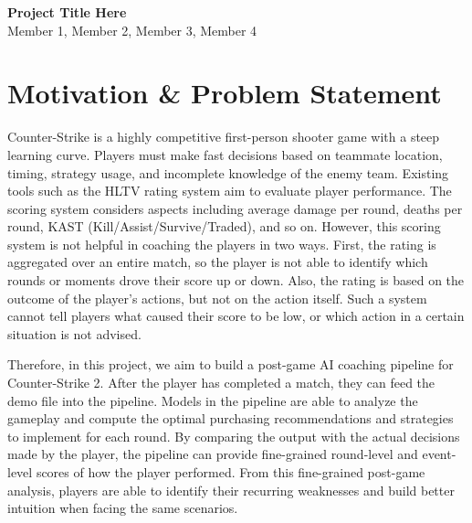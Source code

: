 \documentclass[11pt, letterpaper]{article}
\begin{document}
\begin{center}
  {\Large\bfseries\color{headcolor} Project Title Here}\\[4pt]
  {\normalsize Member 1, Member 2, Member 3, Member 4}\\[2pt]
\end{center}

\vspace{4pt}

\section{Motivation \& Problem Statement}
\begin{tcolorbox}[sectionbox, height=4.6cm, valign=top]
	Counter-Strike is a highly competitive first-person shooter game with a steep learning curve.
	Players must make fast decisions based on teammate location, timing, strategy usage, and incomplete knowledge of the enemy team.
	Existing tools such as the HLTV rating system aim to evaluate player performance.
	The scoring system considers aspects including average damage per round, deaths per round, KAST (Kill/Assist/Survive/Traded), and so on.
	However, this scoring system is not helpful in coaching the players in two ways.
	First, the rating is aggregated over an entire match, so the player is not able to identify which rounds or moments drove their score up or down.
	Also, the rating is based on the outcome of the player's actions, but not on the action itself.
	Such a system cannot tell players what caused their score to be low, or which action in a certain situation is not advised.

	Therefore, in this project, we aim to build a post-game AI coaching pipeline for Counter-Strike 2.
	After the player has completed a match, they can feed the demo file into the pipeline.
	Models in the pipeline are able to analyze the gameplay and compute the optimal purchasing recommendations and strategies to implement for each round.
	By comparing the output with the actual decisions made by the player, the pipeline can provide fine-grained round-level and event-level scores of how the player performed.
	From this fine-grained post-game analysis, players are able to identify their recurring weaknesses and build better intuition when facing the same scenarios.
\end{tcolorbox}

\end{document}
